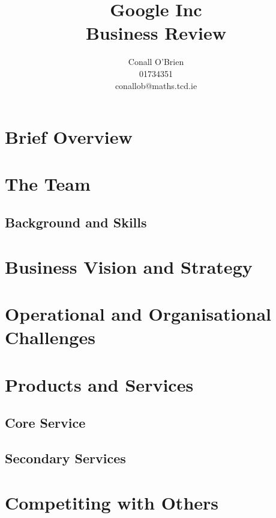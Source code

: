\documentclass[a4paper,12pt]{article}
\begin{document}
\title{Google Inc \\ Business Review}

\author{Conall O'Brien \\ 01734351 \\ conallob@maths.tcd.ie}

\maketitle

\newpage

\doublespacing

\section{Brief Overview}



\section{The Team}


\subsection{Background and Skills}

\section{Business Vision and Strategy}

\section{Operational and Organisational Challenges}

\section{Products and Services}

\subsection{Core Service}

\subsection{Secondary Services}

\section{Competiting with Others}
\end{document}
